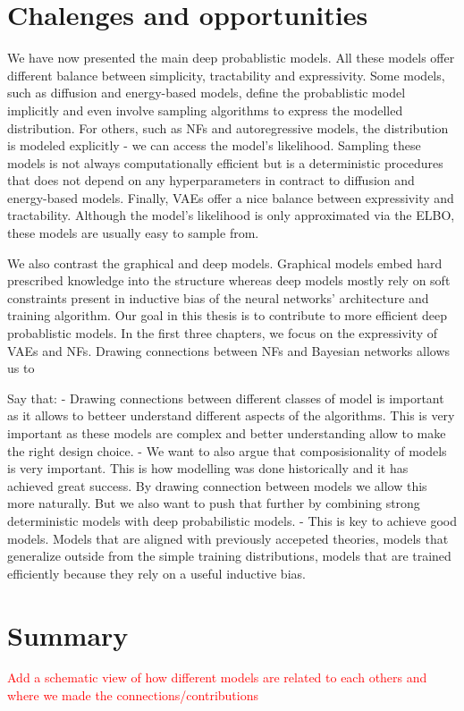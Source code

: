 \section{Chalenges and opportunities}
We have now presented the main deep probablistic models. All these models offer different balance between simplicity, tractability and expressivity. Some models, such as diffusion and energy-based models, define the probablistic model implicitly and even involve sampling algorithms to express the modelled distribution. For others, such as NFs and autoregressive models, the distribution is modeled explicitly - we can access the model's likelihood. Sampling these models is not always computationally efficient but is a deterministic procedures that does not depend on any hyperparameters in contract to diffusion and energy-based models. Finally, VAEs offer a nice balance between expressivity and tractability. Although the model's likelihood is only approximated via the ELBO, these models are usually easy to sample from.

We also contrast the graphical and deep models. Graphical models embed hard prescribed knowledge into the structure whereas deep models mostly rely on soft constraints present in inductive bias of the neural networks' architecture and training algorithm. Our goal in this thesis is to contribute to more efficient deep probablistic models. In the first three chapters, we focus on the expressivity of VAEs and NFs. Drawing connections between NFs and Bayesian networks allows us to

Say that:
- Drawing connections between different classes of model is important as it allows to betteer understand different aspects of the algorithms.
  This is very important as these models are complex and better understanding allow to make the right design choice.
- We want to also argue that composisionality of models is very important. This is how modelling was done historically and it has achieved great success. By drawing connection between models we allow this more naturally. But we also want to push that further by combining strong deterministic models with deep probabilistic models.
- This is key to achieve good models. Models that are aligned with previously accepeted theories, models that generalize outside from the simple training distributions, models that are trained efficiently because they rely on a useful inductive bias.
\section{Summary}

\textcolor{red}{Add a schematic view of how different models are related to each others and where we made the connections/contributions}
